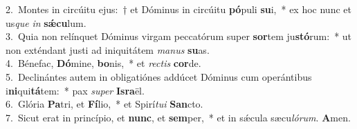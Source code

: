 {2.~}Montes in circúitu ejus:~† et Dóminus in circúitu \textbf{pó}puli \textbf{su}i,~* ex hoc nunc et us\textit{que} \textit{in} \textbf{sǽ}\textbf{cu}lum.\\
{3.~}Quia non relínquet Dóminus virgam peccatórum super \textbf{sor}tem ju\textbf{stó}rum:~* ut non exténdant justi ad iniquitátem \textit{ma}\textit{nus} \textbf{su}as.\\
{4.~}Bénefac, \textbf{Dó}mine, \textbf{bo}nis,~* et \textit{re}\textit{ctis} \textbf{cor}de.\\
{5.~}Declinántes autem in obligatiónes addúcet Dóminus cum operántibus i\textbf{ni}qui\textbf{tá}tem:~* pax \textit{su}\textit{per} \textbf{Is}\textbf{ra}ël.\\
{6.~}Glória \textbf{Pa}tri, et \textbf{Fí}lio,~* et Spirí\textit{tu}\textit{i} \textbf{San}cto.\\
{7.~}Sicut erat in princípio, et \textbf{nunc}, et \textbf{sem}per,~* et in sǽcula sæcu\textit{ló}\textit{rum}. \textbf{A}men.\\
